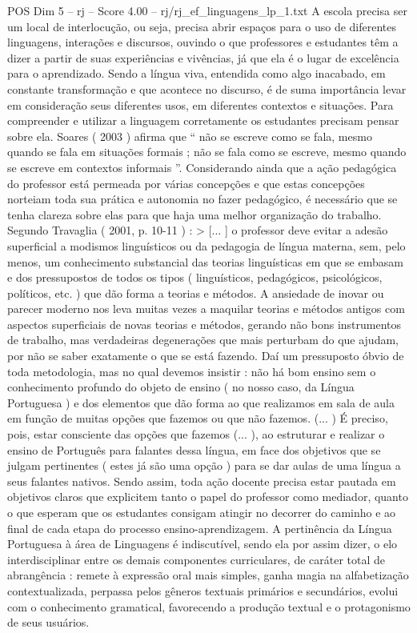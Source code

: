 \begin{textsample}{POS Dim 5 – rj – Score 4.00 – rj/rj\_ef\_linguagens\_lp\_1.txt}
A escola precisa ser um local de interlocução, ou seja, precisa abrir espaços para o uso de diferentes linguagens, interações e discursos, ouvindo o que professores e estudantes têm a dizer a partir de suas experiências e vivências, já que ela é o lugar de excelência para o aprendizado.
Sendo a língua viva, entendida como algo inacabado, em constante transformação e que acontece no discurso, é de suma importância levar em consideração seus diferentes usos, em diferentes contextos e situações.
Para compreender e utilizar a linguagem corretamente os estudantes precisam pensar sobre ela.
Soares ( 2003 ) afirma que “ não se escreve como se fala, mesmo quando se fala em situações formais ; não se fala como se escreve, mesmo quando se escreve em contextos informais ”.
Considerando ainda que a ação pedagógica do professor está permeada por várias concepções e que estas concepções norteiam toda sua prática e autonomia no fazer pedagógico, é necessário que se tenha clareza sobre elas para que haja uma melhor organização do trabalho.
Segundo Travaglia ( 2001, p. 10-11 ) : > [... ] o professor deve evitar a adesão superficial a modismos linguísticos ou da pedagogia de língua materna, sem, pelo menos, um conhecimento substancial das teorias linguísticas em que se embasam e dos pressupostos de todos os tipos ( linguísticos, pedagógicos, psicológicos, políticos, etc. ) que dão forma a teorias e métodos.
A ansiedade de inovar ou parecer moderno nos leva muitas vezes a maquilar teorias e métodos antigos com aspectos superficiais de novas teorias e métodos, gerando não bons instrumentos de trabalho, mas verdadeiras degenerações que mais perturbam do que ajudam, por não se saber exatamente o que se está fazendo.
Daí um pressuposto óbvio de toda metodologia, mas no qual devemos insistir : não há bom ensino sem o conhecimento profundo do objeto de ensino ( no nosso caso, da Língua Portuguesa ) e dos elementos que dão forma ao que realizamos em sala de aula em função de muitas opções que fazemos ou que não fazemos. (... ) É preciso, pois, estar consciente das opções que fazemos (... ), ao estruturar e realizar o ensino de Português para falantes dessa língua, em face dos objetivos que se julgam pertinentes ( estes já são uma opção ) para se dar aulas de uma língua a seus falantes nativos.
Sendo assim, toda ação docente precisa estar pautada em objetivos claros que explicitem tanto o papel do professor como mediador, quanto o que esperam que os estudantes consigam atingir no decorrer do caminho e ao final de cada etapa do processo ensino-aprendizagem.
A pertinência da Língua Portuguesa à área de Linguagens é indiscutível, sendo ela por assim dizer, o elo interdisciplinar entre os demais componentes curriculares, de caráter total de abrangência : remete à expressão oral mais simples, ganha magia na alfabetização contextualizada, perpassa pelos gêneros textuais primários e secundários, evolui com o conhecimento gramatical, favorecendo a produção textual e o protagonismo de seus usuários.

\end{textsample}
